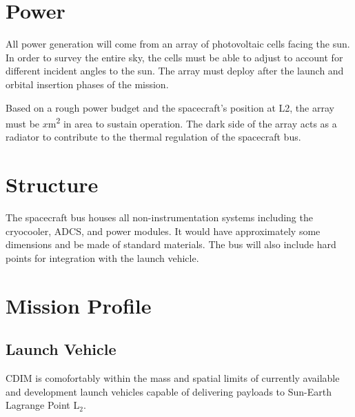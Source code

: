 \documentclass{ws-jai}
\newenvironment{notes}{\color{red}}{}
\begin{document}
\section{Power}
\label{sec:power}
All power generation will come from an array of photovoltaic cells facing the sun.
In order to survey the entire sky, the cells must be able to adjust to account for different incident angles to the sun.
The array must deploy after the launch and orbital insertion phases of the mission.

Based on a rough power budget and the spacecraft's position at L2, {\color{red}the array must be $x$\si{\meter\squared}} in area to sustain operation.
The dark side of the array acts as a radiator to contribute to the thermal regulation of the spacecraft bus.

\section{Structure}
\label{sec:structure}
The spacecraft bus houses all non-instrumentation systems including the cryocooler, ADCS, and power modules.
\begin{notes}
It would have approximately some dimensions and be made of standard materials.
The bus will also include hard points for integration with the launch vehicle.
\end{notes}

\section{Mission Profile}
\label{sec:mission-profile}
\subsection{Launch Vehicle}
\label{subsec:launch}
CDIM is comofortably within the mass and spatial limits of currently available and development launch vehicles capable of delivering payloads to Sun-Earth Lagrange Point L$_2$.
\end{document}
